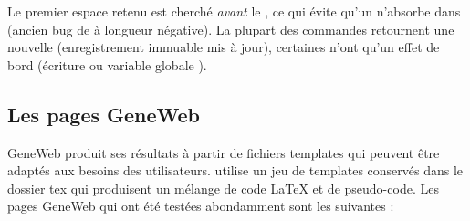 Le premier espace retenu est cherché \emph{avant} le \cmd{>}, ce qui évite
qu'un  n'absorbe  dans 
(ancien bug de  à longueur négative). La plupart des commandes
retournent une nouvelle  (enregistrement immuable mis à jour),
certaines n'ont qu'un effet de bord (écriture ou variable globale
).


\subsection{Les pages GeneWeb}

GeneWeb produit ses résultats à partir de fichiers templates qui peuvent être
adaptés aux besoins des utilisateurs.
\gwtol{} utilise un jeu de templates conservés dans le dossier tex qui
produisent un mélange de code \LaTeX{} et de pseudo-code.
Les pages GeneWeb qui ont été testées abondamment sont les suivantes :

